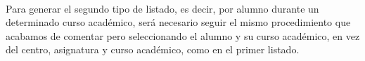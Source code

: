   \paragraph{}Para generar el segundo tipo de listado, es decir, por alumno
  durante un determinado curso académico, será necesario seguir el mismo
  procedimiento que acabamos de comentar pero seleccionando el alumno y su curso
  académico, en vez del centro, asignatura y curso académico, como en el primer
  listado.
